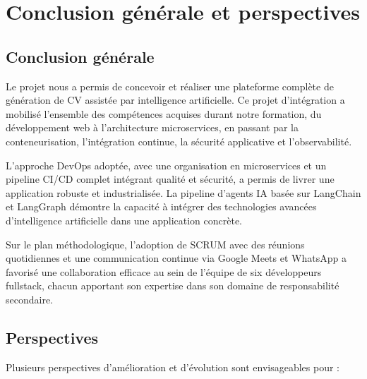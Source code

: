 \chapter{Conclusion générale et perspectives}
\label{chap:conclusion}

\section{Conclusion générale}
\label{sec:conclusion:generale}

Le projet \projectname{} nous a permis de concevoir et réaliser une plateforme complète de génération de CV assistée par intelligence artificielle. Ce projet d'intégration a mobilisé l'ensemble des compétences acquises durant notre formation, du développement web à l'architecture microservices, en passant par la conteneurisation, l'intégration continue, la sécurité applicative et l'observabilité.

L'approche DevOps adoptée, avec une organisation en microservices et un pipeline CI/CD complet intégrant qualité et sécurité, a permis de livrer une application robuste et industrialisée. La pipeline d'agents IA basée sur LangChain et LangGraph démontre la capacité à intégrer des technologies avancées d'intelligence artificielle dans une application concrète.

Sur le plan méthodologique, l'adoption de SCRUM avec des réunions quotidiennes et une communication continue via Google Meets et WhatsApp a favorisé une collaboration efficace au sein de l'équipe de six développeurs fullstack, chacun apportant son expertise dans son domaine de responsabilité secondaire.

\section{Perspectives}
\label{sec:conclusion:perspectives}

Plusieurs perspectives d'amélioration et d'évolution sont envisageables pour \projectname{} :

